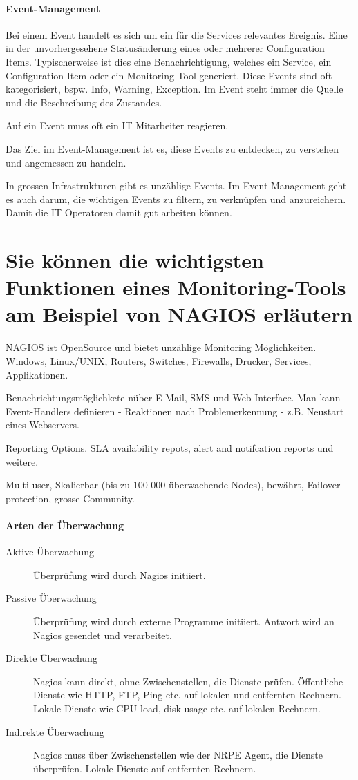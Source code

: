 \paragraph{Event-Management}
Bei einem Event handelt es sich um ein für die Services relevantes Ereignis. Eine in der unvorhergesehene Statusänderung eines oder mehrerer Configuration Items. Typischerweise ist dies eine Benachrichtigung, welches ein Service, ein Configuration Item oder ein Monitoring Tool generiert. Diese Events sind oft kategorisiert, bspw. Info, Warning, Exception. Im Event steht immer die Quelle und die Beschreibung des Zustandes.

Auf ein Event muss oft ein IT Mitarbeiter reagieren. 

Das Ziel im Event-Management ist es, diese Events zu entdecken, zu verstehen und angemessen zu handeln.

In grossen Infrastrukturen gibt es unzählige Events. Im Event-Management geht es auch darum, die wichtigen Events zu filtern, zu verknüpfen und anzureichern. Damit die IT Operatoren damit gut arbeiten können.

\section{Sie können die wichtigsten Funktionen eines Monitoring-Tools am Beispiel von NAGIOS erläutern}

NAGIOS ist OpenSource und bietet unzählige Monitoring Möglichkeiten. Windows, Linux/UNIX, Routers, Switches, Firewalls, Drucker, Services, Applikationen.

Benachrichtungsmöglichkete nüber E-Mail, SMS und Web-Interface. Man kann Event-Handlers definieren - Reaktionen nach Problemerkennung - z.B. Neustart eines Webservers.

Reporting Options. SLA availability repots, alert and notifcation reports und weitere.

Multi-user, Skalierbar (bis zu 100 000 überwachende Nodes), bewährt, Failover protection, grosse Community.

\paragraph{Arten der Überwachung}
\begin{description}
	\item[Aktive Überwachung] Überprüfung wird durch Nagios initiiert.
	\item[Passive Überwachung] Überprüfung wird durch externe Programme initiiert. Antwort wird an Nagios gesendet und verarbeitet.
	\item[Direkte Überwachung] Nagios kann direkt, ohne Zwischenstellen, die Dienste prüfen. Öffentliche Dienste wie HTTP, FTP, Ping etc. auf lokalen und entfernten Rechnern. Lokale Dienste wie CPU load, disk usage etc. auf lokalen Rechnern.
	\item[Indirekte Überwachung] Nagios muss über Zwischenstellen wie der NRPE Agent, die Dienste überprüfen. Lokale Dienste auf entfernten Rechnern.
\end{description}

